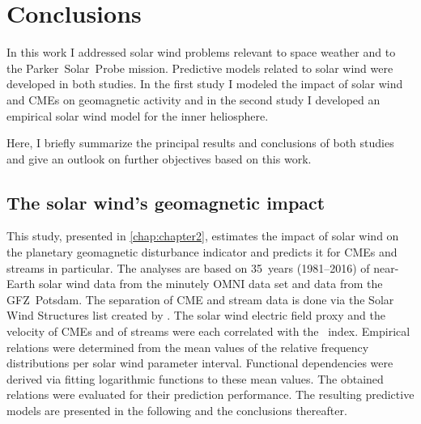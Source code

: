
\chapter{Conclusions}
\label{chap:summary}

In this work I addressed solar wind problems relevant to space weather and to the Parker~Solar~Probe mission. Predictive models related to solar wind were developed in both studies. In the first study I modeled the impact of solar wind and CMEs on geomagnetic activity and in the second study I developed an empirical solar wind model for the inner heliosphere.

Here, I briefly summarize the principal results and conclusions of both studies and give an outlook on further objectives based on this work.

\section{The solar wind's geomagnetic impact}
This study, presented in \autoref{chap:chapter2}, estimates the impact of solar wind on the planetary geomagnetic disturbance indicator \Kp{} and predicts it for CMEs and streams in particular.
The analyses are based on 35~years (1981--2016) of near-Earth solar wind data from the minutely OMNI data set and \Kp{} data from the GFZ~Potsdam. The separation of CME and stream data is done via the Solar Wind Structures list created by \citet{Richardson2000}.
The solar wind electric field proxy \vBz{} and the velocity of CMEs and of streams were each correlated with the \Kp~index. Empirical relations were determined from the mean values of the relative \Kp{} frequency distributions per solar wind parameter interval. Functional dependencies were derived via fitting logarithmic functions to these mean \Kp{} values.
The obtained \Kp{} relations were evaluated for their prediction performance. The resulting predictive models are presented in the following and the conclusions thereafter.

\bigskip


